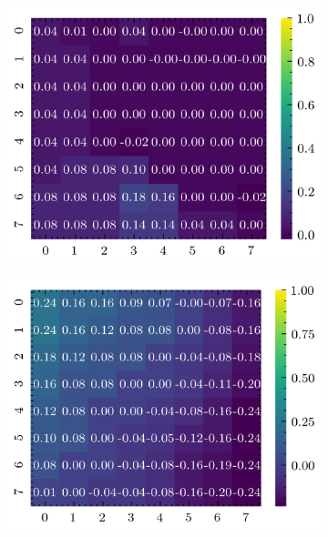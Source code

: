 \begin{figure}[H]
    \begin{subfigure}[b]{0.19\textwidth}
        \includegraphics[width=\linewidth]{../img/5/quarry/best/heatmap-2d-0.png}
    \end{subfigure}
    \begin{subfigure}[b]{0.19\textwidth}
        \includegraphics[width=\linewidth]{../img/5/quarry/best/heatmap-2d-1.png}
    \end{subfigure}  
    \begin{subfigure}[b]{0.19\textwidth}

\end{subfigure}
\end{figure}
